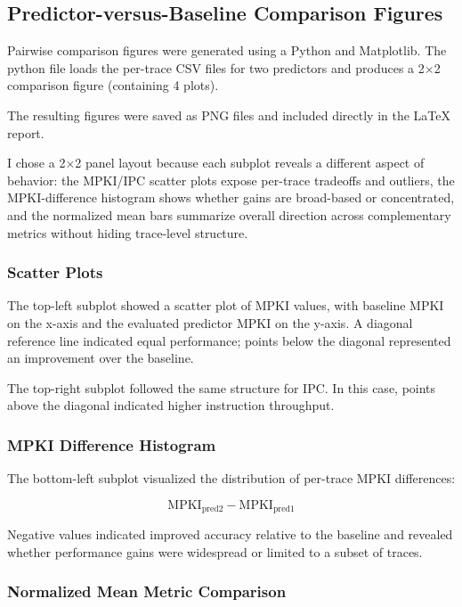 \documentclass[11pt,a4paper]{article}
\begin{document}
\subsection{Predictor-versus-Baseline Comparison Figures}

Pairwise comparison figures were generated using a Python and Matplotlib. The python file loads the per-trace CSV files for two predictors and
produces a 2$\times$2 comparison figure (containing 4 plots).

The resulting figures were saved as PNG files and included directly in the LaTeX report.

I chose a 2$\times$2 panel layout because each subplot reveals a different aspect of behavior: the MPKI/IPC
scatter plots expose per-trace tradeoffs and outliers, the MPKI-difference histogram shows whether gains are
broad-based or concentrated, and the normalized mean bars summarize overall direction across complementary
metrics without hiding trace-level structure.

\subsubsection{Scatter Plots}

The top-left subplot showed a scatter plot of MPKI values, with baseline MPKI on the x-axis and
the evaluated predictor MPKI on the y-axis. A diagonal reference line indicated equal
performance; points below the diagonal represented an improvement over the baseline.

The top-right subplot followed the same structure for IPC. In this case, points above the
diagonal indicated higher instruction throughput.

\subsubsection{MPKI Difference Histogram}

The bottom-left subplot visualized the distribution of per-trace MPKI differences:

\[
\text{MPKI}_{\text{pred2}} - \text{MPKI}_{\text{pred1}}
\]

Negative values indicated improved accuracy relative to the baseline and revealed whether
performance gains were widespread or limited to a subset of traces.

\subsubsection{Normalized Mean Metric Comparison}
\end{document}
